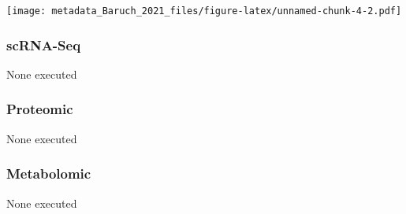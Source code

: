 \documentclass[
]{article}
\begin{document}
\texttt{[image: metadata\_Baruch\_2021\_files/figure-latex/unnamed-chunk-4-2.pdf]}

\hypertarget{scrna-seq}{%
\subsubsection{scRNA-Seq}\label{scrna-seq}}

None executed

\hypertarget{proteomic}{%
\subsubsection{Proteomic}\label{proteomic}}

None executed

\hypertarget{metabolomic}{%
\subsubsection{Metabolomic}\label{metabolomic}}

None executed
\end{document}
